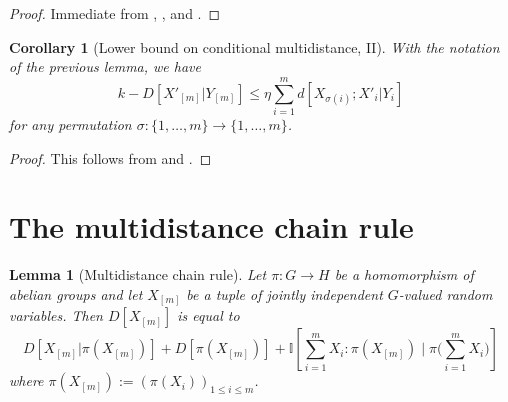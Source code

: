 \documentclass[10pt,a4paper]{article}
\newtheorem{lemma}[theorem]{Lemma}
\newtheorem{corollary}[theorem]{Corollary}
\newcommand{\lean}[1]{}
\newcommand{\uses}[1]{}
\newcommand{\leanok}{}
\newcommand{\bbI}{\mathbb{I}}
\begin{document}
\begin{proof}\uses{multidist-lower, cond-multidist-def, cond-multidist-alt}\leanok
  Immediate from , , and .
\end{proof}

\begin{corollary}[Lower bound on conditional multidistance, II]\label{cond-multidist-lower-II}\lean{sub_condMultiDistance_le'}\leanok With the notation of the previous lemma, we have
  \begin{equation}\label{5.3-conv}
    k - D[ X'_{[m]} | Y_{[m]} ] \leq \eta \sum_{i=1}^m d[X_{\sigma(i)};X'_i|Y_i]
  \end{equation}
for any permutation $\sigma : \{1,\dots,m\} \rightarrow \{1,\dots,m\}$.
\end{corollary}

\begin{proof}\uses{cond-multidist-lower, multidist-perm}\leanok  This follows from  and .
\end{proof}

\section{The multidistance chain rule}

\begin{lemma}[Multidistance chain rule]\label{multidist-chain-rule}\lean{multiDist_chainRule}\uses{multidist-def}\leanok  Let $\pi \colon G \to H$ be a homomorphism of abelian groups and let $X_{[m]}$ be a tuple of jointly independent $G$-valued random variables.  Then $D[X_{[m]}]$ is equal to
  \begin{equation}
      D[ X_{[m]} | \pi(X_{[m]}) ]  +D[ \pi(X_{[m]}) ]  + \bbI[ \sum_{i=1}^m X_i  : \pi(X_{[m]}) \; \big| \; \pi\bigl(\sum_{i=1}^m X_i\bigr) ]
    \label{chain-eq}
  \end{equation}
  where $\pi(X_{[m]}) := (\pi(X_i))_{1 \leq i \leq m}$.
  \end{lemma}
\end{document}
